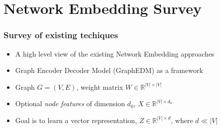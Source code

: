 \documentclass{beamer}
\begin{document}
\section{Network Embedding Survey}
\begin{frame}
    \frametitle{Survey of existing techiques}

    \begin{itemize}
        \item A high level view of the existing Network Embedding approaches \cite{chami2020machine}
        \item Graph Encoder Decoder Model (GraphEDM) as a framework 
        \item Graph $G=(V,E)$, weight matrix $W\in \mathbb{R}^{|V|\times|V|}$
        \item Optional \textit{node features} of dimension $d_{0}$, $X \in \mathbb{R}^{|V|\times d_{0}}$
        \item Goal is to learn a vector representation, $Z \in \mathbb{R}^{|V|\times d}$, where $d \ll |V|$
    \end{itemize}
    
\end{frame}
\end{document}
